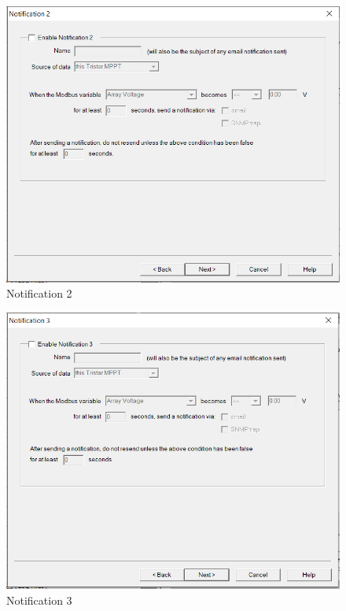 \begin{figure}[!htb]
	\includegraphics[width=\textwidth,height=\textwidth]{./graphics/tsmppt_troubleshooting/ms_15.png}
	\caption{\label{fig:settings-10} Notification 2}
\end{figure}
\begin{figure}[!htb]
	\includegraphics[width=\textwidth,height=\textwidth]{./graphics/tsmppt_troubleshooting/ms_16.png}
	\caption{\label{fig:settings-11} Notification 3}
\end{figure}
